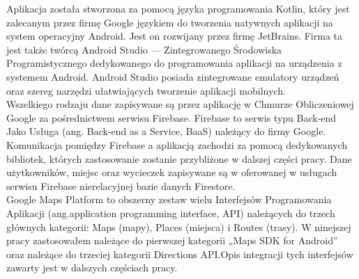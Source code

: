     Aplikacja została stworzona za pomocą języka programowania Kotlin, który jest zalecanym przez firmę Google językiem do tworzenia natywnych aplikacji na system operacyjny Android.
    Jest on rozwijany przez firmę JetBrains. Firma ta jest także twórcą Android Studio — Zintegrowanego Środowiska Programistycznego dedykowanego do programowania aplikacji na urządzenia
    z systemem Android. Android Studio posiada zintegrowane emulatory urządzeń oraz szereg narzędzi ułatwiających tworzenie aplikacji mobilnych. \\

    Wszelkiego rodzaju dane zapisywane są przez aplikację w Chmurze Obliczeniowej Google za pośrednictwem serwisu Firebase. Firebase to serwis typu Back-end Jako Usługa 
    (ang. Back-end as a Service, BaaS) należący do firmy Google. Komunikacja pomiędzy Firebase a aplikacją zachodzi za pomocą dedykowanych bibliotek, których zastosowanie zostanie
    przybliżone w dalszej części pracy. Dane użytkowników, miejsc oraz wycieczek zapisywane są w oferowanej w usługach serwisu Firebase nierelacyjnej bazie danych Firestore. \\

    Google Maps Platform to obszerny zestaw wielu Interfejsów Programowania Aplikacji (ang.\@ application programming interface, API) należących do trzech głównych kategorii:
    Maps (mapy), Places (miejsca) i Routes (trasy). W ninejszej pracy zastosowałem należące do pierwszej kategorii „Maps SDK for Android” oraz należące do trzeciej
    kategorii Directions API.\@ Opis integracji tych interfejsów zawarty jest w dalszych częściach pracy.
